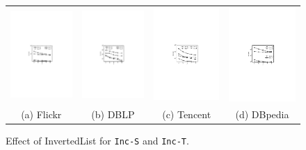 \begin{figure}[htb]
\setlength{\abovecaptionskip}{0.cm}
\setlength{\belowcaptionskip}{-1cm}
\hspace*{-.4cm}
\centering
\begin{tabular}{c c c c}
  \begin{minipage}{3.36cm}
	\includegraphics[width=3.325cm]{figures/flickrInverted}
  \end{minipage}
  &
  \begin{minipage}{3.36cm}
	\includegraphics[width=3.325cm]{figures/dblpInverted}
  \end{minipage}
  &
  \begin{minipage}{3.36cm}
	\includegraphics[width=3.325cm]{figures/tencentInverted}
  \end{minipage}
  &
  \begin{minipage}{3.36cm}
	\includegraphics[width=3.325cm]{figures/dbpediaInverted}
  \end{minipage}
  \\
  \small (a) Flickr
  &
  \small (b) DBLP
  &
  \small (c) Tencent
  &
  \small (d) DBpedia
\end{tabular}
\caption{Effect of InvertedList for {\tt Inc-S} and {\tt Inc-T}.}
\label{fig:exp-more-inverted}
\end{figure}

